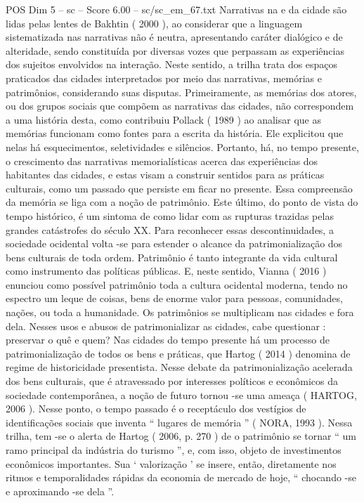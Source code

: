 \begin{textsample}{POS Dim 5 – sc – Score 6.00 – sc/sc\_em\_67.txt}
Narrativas na e da cidade são lidas pelas lentes de Bakhtin ( 2000 ), ao considerar que a linguagem sistematizada nas narrativas não é neutra, apresentando caráter dialógico e de alteridade, sendo constituída por diversas vozes que perpassam as experiências dos sujeitos envolvidos na interação.
Neste sentido, a trilha trata dos espaços praticados das cidades interpretados por meio das narrativas, memórias e patrimônios, considerando suas disputas.
Primeiramente, as memórias dos atores, ou dos grupos sociais que compõem as narrativas das cidades, não correspondem a uma história desta, como contribuiu Pollack ( 1989 ) ao analisar que as memórias funcionam como fontes para a escrita da história.
Ele explicitou que nelas há esquecimentos, seletividades e silêncios.
Portanto, há, no tempo presente, o crescimento das narrativas memorialísticas acerca das experiências dos habitantes das cidades, e estas visam a construir sentidos para as práticas culturais, como um passado que persiste em ficar no presente.
Essa compreensão da memória se liga com a noção de patrimônio.
Este último, do ponto de vista do tempo histórico, é um sintoma de como lidar com as rupturas trazidas pelas grandes catástrofes do século XX.
Para reconhecer essas descontinuidades, a sociedade ocidental volta -se para estender o alcance da patrimonialização dos bens culturais de toda ordem.
Patrimônio é tanto integrante da vida cultural como instrumento das políticas públicas.
E, neste sentido, Vianna ( 2016 ) enunciou como possível patrimônio toda a cultura ocidental moderna, tendo no espectro um leque de coisas, bens de enorme valor para pessoas, comunidades, nações, ou toda a humanidade.
Os patrimônios se multiplicam nas cidades e fora dela.
Nesses usos e abusos de patrimonializar as cidades, cabe questionar : preservar o quê e quem?
Nas cidades do tempo presente há um processo de patrimonialização de todos os bens e práticas, que Hartog ( 2014 ) denomina de regime de historicidade presentista.
Nesse debate da patrimonialização acelerada dos bens culturais, que é atravessado por interesses políticos e econômicos da sociedade contemporânea, a noção de futuro tornou -se uma ameaça ( HARTOG, 2006 ).
Nesse ponto, o tempo passado é o receptáculo dos vestígios de identificações sociais que inventa “ lugares de memória ” ( NORA, 1993 ).
Nessa trilha, tem -se o alerta de Hartog ( 2006, p. 270 ) de o patrimônio se tornar “ um ramo principal da indústria do turismo ”, e, com isso, objeto de investimentos econômicos importantes.
Sua ‘ valorização ’ se insere, então, diretamente nos ritmos e temporalidades rápidas da economia de mercado de hoje, “ chocando -se e aproximando -se dela ”.

\end{textsample}
